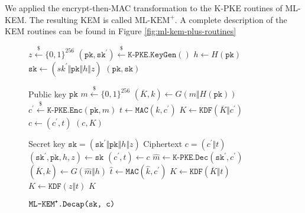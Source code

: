 \documentclass[journal=tches,submission]{iacrtrans}
\newcommand{\keygen}{\texttt{KeyGen}}
\newcommand{\encrypt}{\texttt{Enc}}
\newcommand{\decrypt}{\texttt{Dec}}
\newcommand{\encap}{\texttt{Encap}}
\newcommand{\decap}{\texttt{Decap}}
\newcommand{\mac}{\texttt{MAC}}
\newcommand{\pk}{\texttt{pk}}
\newcommand{\sk}{\texttt{sk}}
\newcommand{\leftsample}{\stackrel{\$}{\leftarrow}}
\def\mlkemplus{\text{ML-KEM}^+}
\begin{document}
We applied the encrypt-then-MAC transformation to the K-PKE routines of ML-KEM. The resulting KEM is called $\mlkemplus$. A complete description of the KEM routines can be found in Figure \ref{fig:ml-kem-plus-routines}

\begin{figure}[h]
    \centering

    \begin{minipage}[t]{0.5\textwidth}
        \begin{algorithm}[H]
            \caption*{$\texttt{ML-KEM}^\texttt{+}\texttt{.}\keygen\texttt{()}$}
            \begin{algorithmic}[1]
                \State $z \leftsample \{0,1\}^{256}$
                \State $(\pk, \sk^\prime) \leftsample \texttt{K-PKE}.\keygen()$
                \State $h \leftarrow H(\pk)$
                \State $\sk \leftarrow (sk^\prime \Vert \pk \Vert h \Vert z)$
                \State \Return $(\pk, \sk)$
            \end{algorithmic}
        \end{algorithm}\vspace{-0.5cm}
        \begin{algorithm}[H]
            \caption*{$\texttt{ML-KEM}^\texttt{+}\texttt{.}\encap\texttt{(\pk)}$}
            \begin{algorithmic}[1]
                \Require Public key $\pk$
                \State $m \leftsample \{0,1\}^{256}$
                \State $(\overline{K}, k) \leftarrow G(m \Vert H(\pk))$
                \State $c^\prime \leftsample \texttt{K-PKE}.\encrypt(\pk, m)$
                \State $t \leftarrow \mac(k, c^\prime)$
                \State $K \leftarrow \texttt{KDF}(\overline{K} \Vert c^\prime)$
                \State $c \leftarrow (c^\prime, t)$
                \State \Return $(c, K)$
            \end{algorithmic}
        \end{algorithm}
    \end{minipage}\hfill
    \begin{minipage}[t]{0.49\textwidth}
        \begin{algorithm}[H]
            \caption*{$\texttt{ML-KEM}^\texttt{+}\texttt{.}\decap\texttt{(\sk, c)}$}
            \begin{algorithmic}[1]
                \Require Secret key $\sk = (\sk^\prime \Vert \pk \Vert h \Vert z)$
                \Require Ciphertext $c = (c^\prime \Vert t)$
                \State $(\sk^\prime, \pk, h, z) \leftarrow \sk$
                \State $(c^\prime, t) \leftarrow c$
                \State $\hat{m} \leftarrow \texttt{K-PKE}.\decrypt(\sk^\prime, c^\prime)$
                \State $(\overline{K}, \hat{k}) \leftarrow G(\hat{m} \Vert h)$
                \State $\hat{t} \leftarrow \mac(\hat{k}, c^\prime)$
                    \State $K \leftarrow \texttt{KDF}(\overline{K} \Vert t)$
                \Else
                    \State $K \leftarrow \texttt{KDF}(z \Vert t)$
                \EndIf
                \State \Return $K$
            \end{algorithmic}
        \end{algorithm}
    \end{minipage}


\end{figure}
\end{document}
